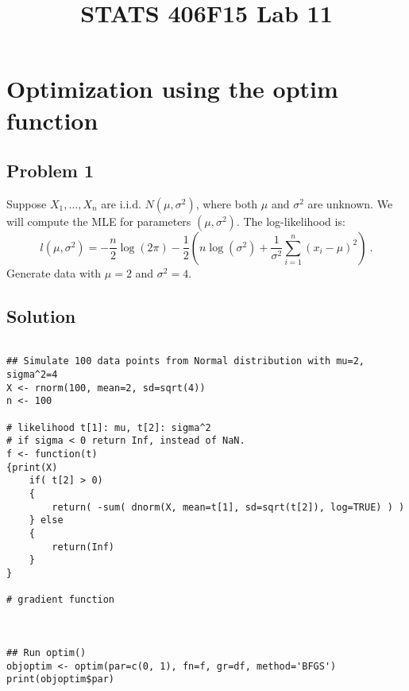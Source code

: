 \documentclass[12pt]{article}
\begin{document}

\title{\Large \bf STATS 406F15 Lab 11}
\date{}

\maketitle





\section{Optimization using the optim function}

\subsection*{Problem 1}

Suppose $X_1, \ldots, X_n$ are i.i.d. $N(\mu, \sigma^2)$, where both $\mu$ and $\sigma^2$ are unknown. We will compute the MLE for parameters $(\mu, \sigma^2)$. The log-likelihood is:
$$l(\mu, \sigma^2) = -\frac{n}{2} \log(2 \pi ) -\frac{1}{2} (n \log(\sigma^2 ) + \frac{1}{\sigma^2} \sum_{i=1}^n (x_i - \mu)^2) \ .$$
Generate data with $\mu=2$ and $\sigma^2=4$.

\subsection*{Solution}

\begin{verbatim}

## Simulate 100 data points from Normal distribution with mu=2, sigma^2=4
X <- rnorm(100, mean=2, sd=sqrt(4))
n <- 100

# likelihood t[1]: mu, t[2]: sigma^2
# if sigma < 0 return Inf, instead of NaN.
f <- function(t)
{print(X)
    if( t[2] > 0)
    {
        return( -sum( dnorm(X, mean=t[1], sd=sqrt(t[2]), log=TRUE) ) )
    } else
    {
        return(Inf)
    }
}

# gradient function



## Run optim() 
objoptim <- optim(par=c(0, 1), fn=f, gr=df, method='BFGS')
print(objoptim$par)

\end{verbatim}
\end{document}
